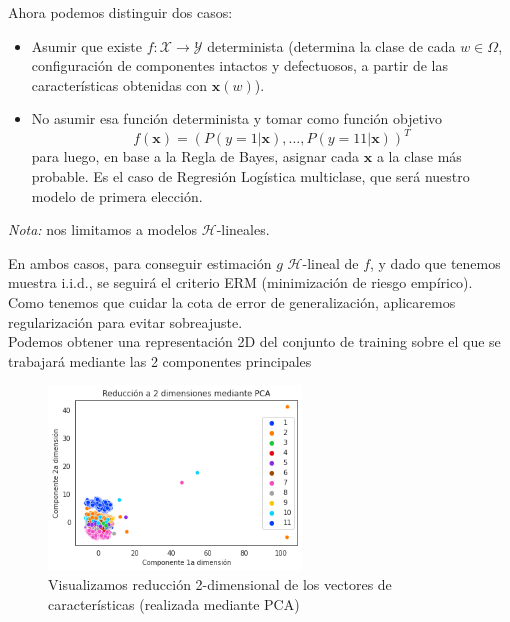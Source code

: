 \documentclass[11pt,a4paper]{article}
\theoremstyle{definition}
\begin{document}
	Ahora podemos distinguir dos casos:
	
	\begin{itemize}
	\item Asumir que existe $f\colon \mathcal{X} \to \mathcal{Y}$ determinista (determina la clase de cada $w\in \Omega$, configuración de componentes intactos y defectuosos, a partir de las características obtenidas con $\mathbf{x}(w)$).%
	\item No asumir esa función determinista y tomar como función objetivo $$f(\mathbf{x})=(P(y=1|\mathbf{x}),\ldots, P(y=11|\mathbf{x}))^T$$
	para luego, en base a la Regla de Bayes, asignar cada $\mathbf{x}$ a la clase más probable. Es el caso de Regresión Logística multiclase, que será nuestro modelo de primera elección.
	\end{itemize}
	\textit{Nota:} nos limitamos a modelos $\mathcal{H}$-lineales.
	
	En ambos casos, para conseguir estimación $g$ $\mathcal{H}$-lineal de $f$, y dado que tenemos muestra i.i.d., se seguirá el criterio ERM (minimización de riesgo empírico). Como tenemos que cuidar la cota de error de generalización, aplicaremos regularización para evitar sobreajuste.\\
	
	\iffalse Podemos obtener una representación 2D del conjunto de training sobre el que se trabajará mediante las 2 componentes principales 
	\begin{figure}[H]
		\centering
		\includegraphics[width=0.6\textwidth]{images/repre_class}
		\caption{Visualizamos reducción 2-dimensional de los vectores de características (realizada mediante PCA)}
	\end{figure}
	
\end{document}
